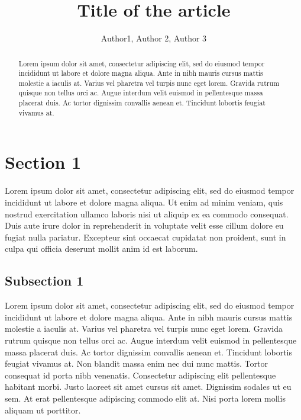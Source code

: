 \documentclass[
  journal=Notes,
  manuscript=for-review,
  year=2022,
  volume=1,
]{dgl-journal}
\title{Title of the article}
\author{Author1, Author 2, Author 3}
\begin{document}
\begin{abstract}
Lorem ipsum dolor sit amet, consectetur adipiscing elit, sed do eiusmod tempor incididunt ut labore et dolore magna aliqua. Ante in nibh mauris cursus mattis molestie a iaculis at. Varius vel pharetra vel turpis nunc eget lorem. Gravida rutrum quisque non tellus orci ac. Augue interdum velit euismod in pellentesque massa placerat duis. Ac tortor dignissim convallis aenean et. Tincidunt lobortis feugiat vivamus at.
\end{abstract}

\section{Section 1}
Lorem ipsum dolor sit amet, consectetur adipiscing elit, sed do eiusmod tempor incididunt ut labore et dolore magna aliqua. Ut enim ad minim veniam, quis nostrud exercitation ullamco laboris nisi ut aliquip ex ea commodo consequat. Duis aute irure dolor in reprehenderit in voluptate velit esse cillum dolore eu fugiat nulla pariatur. Excepteur sint occaecat cupidatat non proident, sunt in culpa qui officia deserunt mollit anim id est laborum. 

\subsection{Subsection 1}
Lorem ipsum dolor sit amet, consectetur adipiscing elit, sed do eiusmod tempor incididunt ut labore et dolore magna aliqua. Ante in nibh mauris cursus mattis molestie a iaculis at. Varius vel pharetra vel turpis nunc eget lorem. Gravida rutrum quisque non tellus orci ac. Augue interdum velit euismod in pellentesque massa placerat duis. Ac tortor dignissim convallis aenean et. Tincidunt lobortis feugiat vivamus at. Non blandit massa enim nec dui nunc mattis. Tortor consequat id porta nibh venenatis. Consectetur adipiscing elit pellentesque habitant morbi. Justo laoreet sit amet cursus sit amet. Dignissim sodales ut eu sem. At erat pellentesque adipiscing commodo elit at. Nisi porta lorem mollis aliquam ut porttitor.
\end{document}
